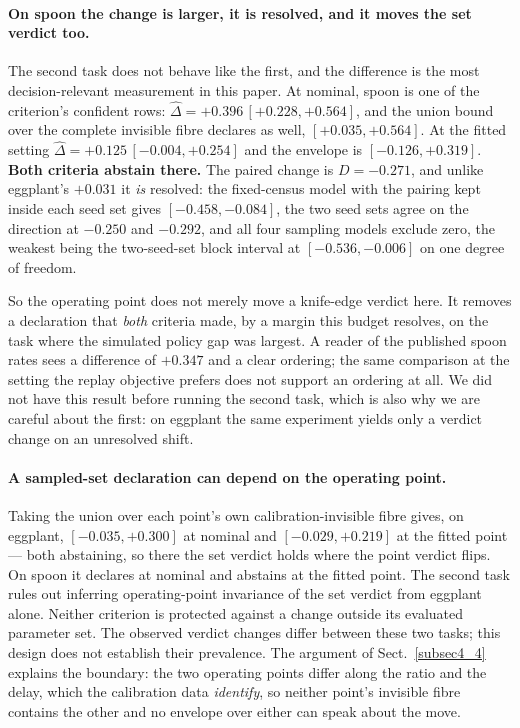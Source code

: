 \documentclass[pdflatex,iicol,sn-apa]{sn-jnl}
\theoremstyle{remark}
\begin{document}
\paragraph{On spoon the change is larger, it is resolved, and it moves the set verdict too.}
The second task does not behave like the first, and the difference is the most decision-relevant
measurement in this paper. At nominal, spoon is one of the criterion's confident rows:
$\hat\Delta = +0.396\,[+0.228, +0.564]$, and the union bound over the complete invisible fibre
declares as well, $[+0.035, +0.564]$. At the fitted setting $\hat\Delta = +0.125\,[-0.004, +0.254]$
and the envelope is $[-0.126, +0.319]$. \textbf{Both criteria abstain there.} The paired change is
$D = -0.271$, and unlike eggplant's $+0.031$ it \emph{is} resolved: the fixed-census model with the
pairing kept inside each seed set gives $[-0.458, -0.084]$, the two seed sets agree on the direction
at $-0.250$ and $-0.292$, and all four sampling models exclude zero, the weakest being the
two-seed-set block interval at $[-0.536, -0.006]$ on one degree of freedom.

So the operating point does not merely move a knife-edge verdict here. It removes a declaration that
\emph{both} criteria made, by a margin this budget resolves, on the task where the simulated policy
gap was largest. A reader of the published spoon rates sees a difference of $+0.347$ and a clear
ordering; the same comparison at the setting the replay objective prefers does not support an
ordering at all. We did not have this result before running the second task, which is also why we
are careful about the first: on eggplant the same experiment yields only a verdict change on an
unresolved shift.

\paragraph{A sampled-set declaration can depend on the operating point.}
Taking the union over each point's own calibration-invisible fibre gives, on eggplant,
$[-0.035, +0.300]$ at nominal and $[-0.029, +0.219]$ at the fitted point --- both abstaining, so
there the set verdict holds where the point verdict flips. On spoon it declares at nominal and
abstains at the fitted point. The second task rules out inferring operating-point invariance of
the set verdict from eggplant alone. Neither criterion is protected against a change outside its
evaluated parameter set. The observed verdict changes differ between these two tasks; this design
does not establish their prevalence. The argument of Sect.~\ref{subsec4_4} explains the boundary: the two
operating points differ along the ratio and the delay, which the calibration data \emph{identify},
so neither point's invisible fibre contains the other and no envelope over either can speak about
the move.
\end{document}
